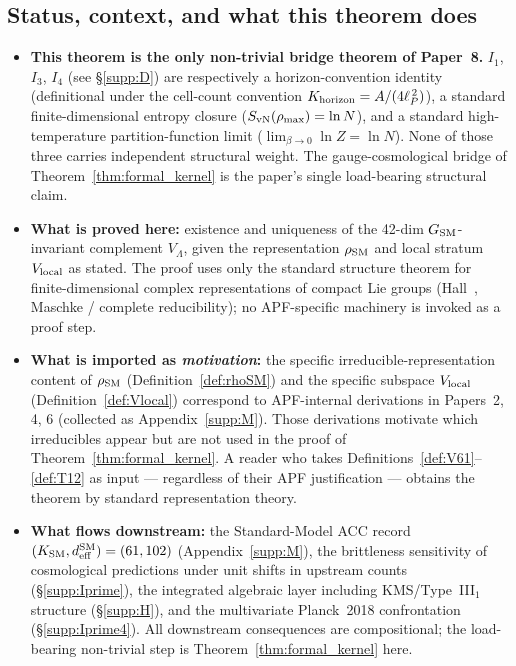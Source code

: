 \documentclass[11pt]{article}
\theoremstyle{plain}
\theoremstyle{definition}
\theoremstyle{remark}
\begin{document}
\bigskip

\subsection{Status, context, and what this theorem does}\label{supp:kernel_status}

\begin{itemize}[leftmargin=2em,itemsep=4pt]
  \item \textbf{This theorem is the only non-trivial bridge theorem of Paper~8.}  $I_1$, $I_3$, $I_4$ (see \S\ref{supp:D}) are respectively a horizon-convention identity (definitional under the cell-count convention $K_{\rm horizon} = A/(4\ell_P^{\,2})$), a standard finite-dimensional entropy closure ($S_{\rm vN}(\rho_{\rm max}) = \ln N$), and a standard high-temperature partition-function limit ($\lim_{\beta \to 0} \ln Z = \ln N$).  None of those three carries independent structural weight.  The gauge-cosmological bridge of Theorem~\ref{thm:formal_kernel} is the paper's single load-bearing structural claim.

  \item \textbf{What is proved here:} existence and uniqueness of the 42-dim $G_{\rm SM}$-invariant complement $V_\Lambda$, given the representation $\rho_{\rm SM}$ and local stratum $V_{\rm local}$ as stated.  The proof uses only the standard structure theorem for finite-dimensional complex representations of compact Lie groups (Hall~\cite{Hall2015}, Maschke / complete reducibility); no APF-specific machinery is invoked as a proof step.

  \item \textbf{What is imported as \emph{motivation}:} the specific irreducible-representation content of $\rho_{\rm SM}$ (Definition~\ref{def:rhoSM}) and the specific subspace $V_{\rm local}$ (Definition~\ref{def:Vlocal}) correspond to APF-internal derivations in Papers~2, 4, 6 (collected as Appendix~\ref{supp:M}).  Those derivations motivate which irreducibles appear but are not used in the proof of Theorem~\ref{thm:formal_kernel}.  A reader who takes Definitions~\ref{def:V61}--\ref{def:T12} as input --- regardless of their APF justification --- obtains the theorem by standard representation theory.

  \item \textbf{What flows downstream:} the Standard-Model ACC record $(K_{\rm SM}, d_{\rm eff}^{\rm SM}) = (61, 102)$ (Appendix~\ref{supp:M}), the brittleness sensitivity of cosmological predictions under unit shifts in upstream counts (\S\ref{supp:Iprime}), the integrated algebraic layer including KMS/Type~III$_1$ structure (\S\ref{supp:H}), and the multivariate Planck~2018 confrontation (\S\ref{supp:Iprime4}).  All downstream consequences are compositional; the load-bearing non-trivial step is Theorem~\ref{thm:formal_kernel} here.


\end{itemize}
\end{document}
